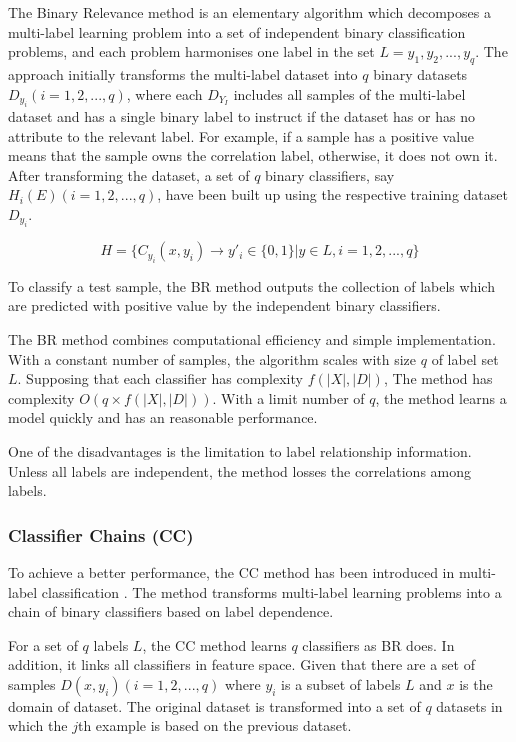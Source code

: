 The Binary Relevance method is an elementary algorithm which decomposes a multi-label learning problem into a set of independent binary classification problems, and each problem harmonises one label in the set $L = {y_{1}, y_{2},...,y_{q}}$. The approach initially transforms the multi-label dataset into $q$ binary datasets $D_{y_{i}} (i = 1,2,...,q)$, where each $D_{Y_{I}}$ includes all samples of the multi-label dataset and has a single binary label to instruct if the dataset has or has no attribute to the relevant label. For example, if a sample has a positive value means that the sample owns the correlation label, otherwise, it does not own it. After transforming the dataset, a set of $q$ binary classifiers, say $H_{i}(E) (i = 1,2,...,q)$, have been built up using the respective training dataset $D_{y_{i}}$. 

\begin{equation}\label{eq:BinaryRelevance}
H = \{C_{y_{i}}(x, y_{i}) \to y'_{i} \in \{0,1\}| y \in L, i = 1,2,...,q\}
\end{equation}

To classify a test sample, the BR method outputs the collection of labels which are predicted with positive value by the independent binary classifiers.

The BR method combines computational efficiency and simple implementation. With a constant number of samples, the algorithm scales with size $q$ of label set $L$. Supposing that each classifier has complexity $f(|X|,|D|)$, The method has complexity $O(q \times f(|X|,|D|))$. With a limit number of $q$, the method learns a model quickly and has an reasonable performance.

One of the disadvantages is the limitation to label relationship information. Unless all labels are independent, the method losses the correlations among labels.

\subsubsection{Classifier Chains (CC)}

To achieve a better performance, the CC method has been introduced in multi-label classification \citep{read2011classifier}. The method transforms multi-label learning problems into a chain of binary classifiers based on label dependence.

For a set of $q$ labels $L$, the CC method learns $q$ classifiers as BR does. In addition, it links all classifiers in feature space. Given that there are a set of samples $D(x,y_{i}) (i = 1,2,...,q)$ where $y_{i}$ is a subset of labels $L$ and $x$ is the domain of dataset. The original dataset is transformed into a set of $q$ datasets in which the $j$th example is based on the previous dataset.

